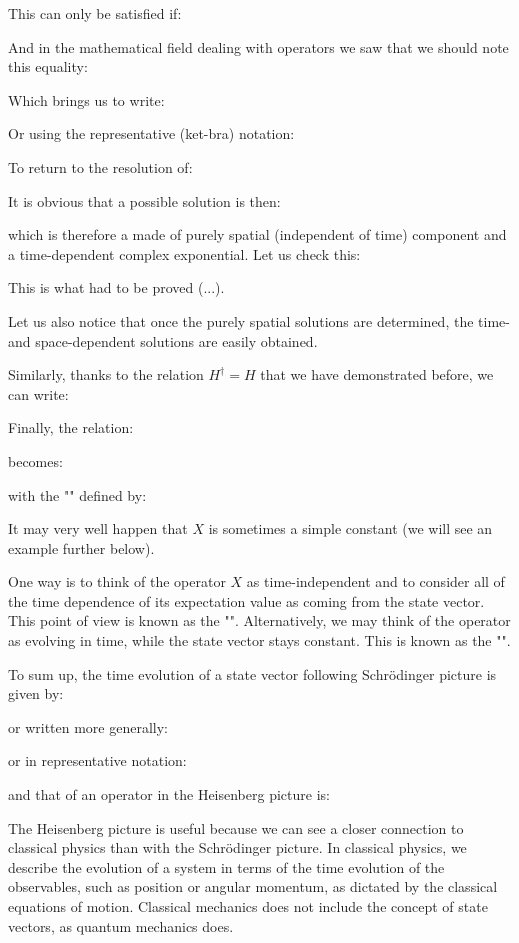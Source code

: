 	This can only be satisfied if:
	
	And in the mathematical field dealing with operators we saw that we should note this equality:
	
	Which brings us to write:
	
	Or using the representative (ket-bra) notation:
	
	To return to the resolution of:
	
	It is obvious that a possible solution is then:
	
	which is therefore a made of purely spatial (independent of time) component and a time-dependent complex exponential. Let us check this:
	
	This is what had to be proved (...).

	Let us also notice that once the purely spatial solutions are determined, the time- and space-dependent solutions are easily obtained.
	
	Similarly, thanks to the relation $H^\dagger=H$ that we have demonstrated before, we can write:
	
	Finally, the relation:
	
	becomes:
	
	with the "" defined by:
	
	\begin{tcolorbox}[title=Remark,colframe=black,arc=10pt]
	It may very well happen that $X$ is sometimes a simple constant (we will see an example further below).
	\end{tcolorbox}
	 One way is to think of the operator $X$ as time-independent and to consider all of the time dependence of its expectation value as coming from the state vector. This point of view is known as the "". Alternatively, we may think of the operator as evolving in time, while the state vector stays constant. This is known as the "". 
	 
	 To sum up, the time evolution of a state vector following Schrödinger picture is given by:
	
	or written more generally:
	
	or in representative notation:
	
	and that of an operator in the Heisenberg picture is:

	The Heisenberg picture is useful because we can see a closer connection to classical physics than with the Schrödinger picture. In classical physics, we describe the evolution of a system in terms of the time evolution of the observables, such as position or angular momentum, as dictated by the classical equations of motion. Classical mechanics does not include the concept of state vectors, as quantum mechanics does.
	
